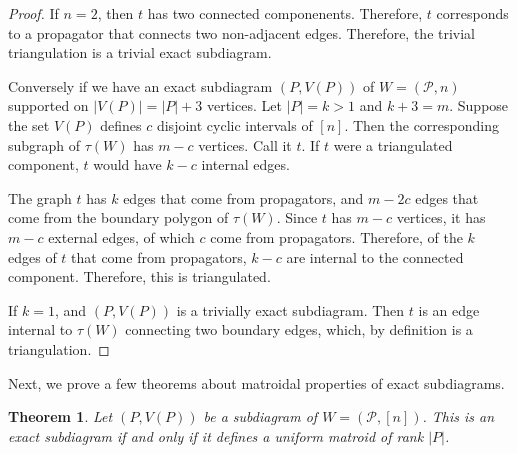 \documentclass[11pt]{article}
\newcommand{\cP}{\mathcal{P}}
\newtheorem{thm}{Theorem}[section]
\theoremstyle{remark}
\theoremstyle{definition}
\begin{document}
\begin{proof}
If $n=2$, then $t$ has two connected componenents. Therefore, $t$ corresponds to a propagator that connects two non-adjacent edges. Therefore, the trivial triangulation is a trivial exact subdiagram.

  Conversely if we have an exact subdiagram $(P, V(P))$ of $W = (\cP, n)$ supported on $|V(P)| = |P|+3$ vertices. Let $|P| = k>1$ and $k+3 = m$. Suppose the set $V(P)$ defines $c$ disjoint cyclic intervals of $[n]$. Then the corresponding subgraph of $\tau(W)$ has $m-c$ vertices. Call it $t$. If $t$ were a triangulated component, $t$ would have $k -c$ internal edges. 
  
  The graph $t$ has $k$ edges that come from propagators, and $m - 2c$ edges that come from the boundary polygon of $\tau(W)$. Since $t$ has $m-c$ vertices, it has $m-c$ external edges, of which $c$ come from propagators. Therefore, of the $k$ edges of $t$ that come from propagators, $k-c$ are internal to the connected component. Therefore, this is triangulated. 
  
  If $k=1$, and $(P, V(P))$ is a trivially exact subdiagram. Then $t$ is an edge internal to $\tau(W)$ connecting two boundary edges, which, by definition is a triangulation. 
  

\end{proof}

Next, we prove a few theorems about matroidal properties of exact subdiagrams.

\begin{thm} \label{exactcircuitlem}
Let $(P, V(P))$ be a subdiagram of $W= (\cP, [n])$. This is an exact subdiagram if and only if it defines a uniform matroid of rank $|P|$.
\end{thm}
\end{document}
